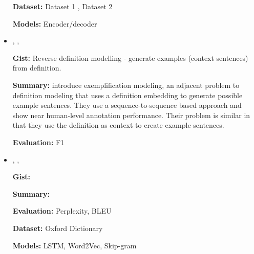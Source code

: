 \documentclass{article}[a4paper]
\newcommand{\bitem}[2]{
    \item[\cite{#1}]
        \citetitle{#1}, \citeauthor{#1}, \citeyear{#1}
        \newline
        {#2}
}%
\begin{document}
\begin{itemize}
{        \textbf{Dataset:}
        Dataset 1 \cite{noraset_definition_2016},
        Dataset 2 \cite{gadetsky_conditional_2018}

        \textbf{Models:}
        Encoder/decoder
    }%

    \bitem{barba_exemplification_2021}%
    {%
        \textbf{Gist:}
        Reverse definition modelling - generate examples (context sentences)
        from definition.

        \textbf{Summary:}
        \citeauthor{barba_exemplification_2021} introduce exemplification
        modeling, an adjacent problem to definition modeling that uses a
        definition embedding to generate possible example sentences. They use a
        sequence-to-sequence based approach and show near human-level annotation
        performance. Their problem is similar in that they use the definition as
        context to create example sentences.

        \textbf{Evaluation:}
        F1
    }%

    \bitem{gadetsky_conditional_2018}%
    {%
        \textbf{Gist:}

        \textbf{Summary:}

        \textbf{Evaluation:}
        Perplexity, BLEU

        \textbf{Dataset:}
        Oxford Dictionary

        \textbf{Models:}
        LSTM, Word2Vec, Skip-gram
    }%


















\end{itemize}

\printbibliography
\end{document}
